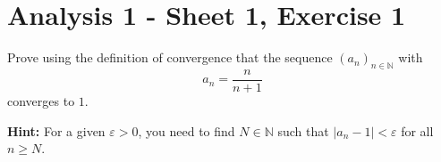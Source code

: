 \documentclass{article}
\begin{document}
\section*{Analysis 1 - Sheet 1, Exercise 1}

Prove using the definition of convergence that the sequence $(a_n)_{n \in \mathbb{N}}$ with 
$$a_n = \frac{n}{n+1}$$
converges to $1$.

\textbf{Hint:} For a given $\varepsilon > 0$, you need to find $N \in \mathbb{N}$ such that $|a_n - 1| < \varepsilon$ for all $n \geq N$.
\end{document}
